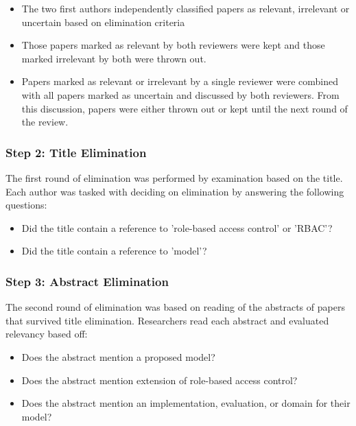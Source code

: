 \begin{itemize}
\setlength{\itemsep}{0.25pt}
\item The two first authors independently classified papers as relevant, irrelevant or uncertain based on elimination criteria
\item Those papers marked as relevant by both reviewers were kept and those marked irrelevant by both were thrown out.
\item Papers marked as relevant or irrelevant by a single reviewer were combined with all papers marked as uncertain and discussed by both reviewers.  From this discussion, papers were either thrown out or kept until the next round of the review.
\end{itemize}

\subsubsection{Step 2: Title Elimination}

The first round of elimination was performed by examination based on the title.  Each author was tasked with deciding on elimination by answering the following questions:

\begin{itemize}
\setlength{\itemsep}{0.25pt}
\item Did the title contain a reference to 'role-based access control' or 'RBAC'? 
\item Did the title contain a reference to 'model'?
\end{itemize}

\subsubsection{Step 3: Abstract Elimination}

The second round of elimination was based on reading of the abstracts of papers that survived title elimination.  Researchers read each abstract and evaluated relevancy based off:

\begin{itemize}
\setlength{\itemsep}{0.25pt}
\item Does the abstract mention a proposed model?
\item Does the abstract mention extension of role-based access control?
\item Does the abstract mention an implementation, evaluation, or domain for their model?
\end{itemize}

